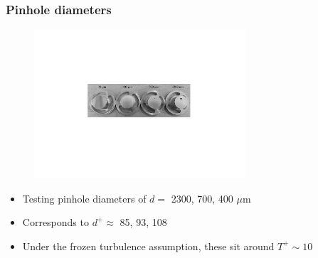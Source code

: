 \documentclass[aspectratio=169,9pt]{beamer}
\begin{document}
\begin{frame}
  \frametitle{Pinhole diameters}
  \begin{figure}
    \centering
    \includegraphics[width=0.7\textwidth]{pinholes.pdf}
  \end{figure}

  \begin{itemize}
    \centering
        \item Testing pinhole diameters of $d=$ 2300, 700, 400 $\mu$m
        \item Corresponds to $d^+ \approx$ 85, 93, 108
        \item Under the frozen turbulence assumption, these sit around $T^+\sim 10$
    \end{itemize}
\end{frame}
\end{document}
